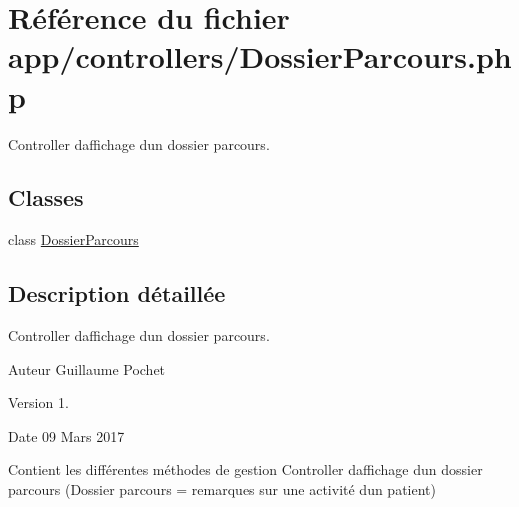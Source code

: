 \hypertarget{_dossier_parcours_8php}{}\section{Référence du fichier app/controllers/\+Dossier\+Parcours.php}
\label{_dossier_parcours_8php}


Controller d\textquotesingle{}affichage d\textquotesingle{}un dossier parcours.  


\subsection*{Classes}
\begin{DoxyCompactItemize}
\item 
class \hyperlink{class_dossier_parcours}{Dossier\+Parcours}
\end{DoxyCompactItemize}


\subsection{Description détaillée}
Controller d\textquotesingle{}affichage d\textquotesingle{}un dossier parcours. 

\begin{DoxyAuthor}{Auteur}
Guillaume Pochet 
\end{DoxyAuthor}
\begin{DoxyVersion}{Version}
1. 
\end{DoxyVersion}
\begin{DoxyDate}{Date}
09 Mars 2017
\end{DoxyDate}
Contient les différentes méthodes de gestion Controller d\textquotesingle{}affichage d\textquotesingle{}un dossier parcours (Dossier parcours = remarques sur une activité d\textquotesingle{}un patient) 